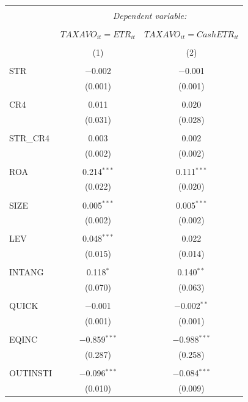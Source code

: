 \documentclass[a4paper]{article}\usepackage[]{graphicx}\usepackage[]{color}
\begin{document}
\begin{table}[!htbp] \centering 
  \caption{} 
  \label{F5} 
\begin{tabular}{@{\extracolsep{5pt}}lcc} 
\\[-1.8ex]\hline 
\hline \\[-1.8ex] 
 & \multicolumn{2}{c}{\textit{Dependent variable:}} \\ 
\cline{2-3} 
\\[-1.8ex] & $TAXAVO_{it}=ETR_{it}$ & $TAXAVO_{it}=CashETR_{it}$ \\ 
\\[-1.8ex] & (1) & (2)\\ 
\hline \\[-1.8ex] 
 STR & $-$0.002 & $-$0.001 \\ 
  & (0.001) & (0.001) \\ 
  & & \\ 
 CR4 & 0.011 & 0.020 \\ 
  & (0.031) & (0.028) \\ 
  & & \\ 
 STR\_CR4 & 0.003 & 0.002 \\ 
  & (0.002) & (0.002) \\ 
  & & \\ 
 ROA & 0.214$^{***}$ & 0.111$^{***}$ \\ 
  & (0.022) & (0.020) \\ 
  & & \\ 
 SIZE & 0.005$^{***}$ & 0.005$^{***}$ \\ 
  & (0.002) & (0.002) \\ 
  & & \\ 
 LEV & 0.048$^{***}$ & 0.022 \\ 
  & (0.015) & (0.014) \\ 
  & & \\ 
 INTANG & 0.118$^{*}$ & 0.140$^{**}$ \\ 
  & (0.070) & (0.063) \\ 
  & & \\ 
 QUICK & $-$0.001 & $-$0.002$^{**}$ \\ 
  & (0.001) & (0.001) \\ 
  & & \\ 
 EQINC & $-$0.859$^{***}$ & $-$0.988$^{***}$ \\ 
  & (0.287) & (0.258) \\ 
  & & \\ 
 OUTINSTI & $-$0.096$^{***}$ & $-$0.084$^{***}$ \\ 
  & (0.010) & (0.009) \\ 

\end{tabular}
\end{table}
\end{document}
